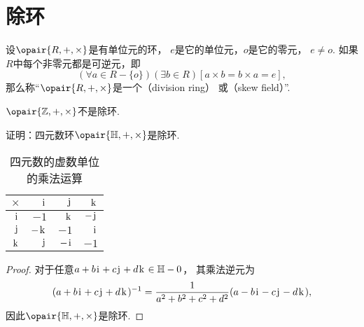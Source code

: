 \section{除环}
\begin{definition}
设\(\opair{R,+,\times}\)是有单位元的环，
\(e\)是它的单位元，\(o\)是它的零元，
\(e \neq o\).
如果\(R\)中每个非零元都是可逆元，即\begin{equation*}
	(\forall a \in R-\{o\})(\exists b \in R)[a \times b = b \times a = e],
\end{equation*}
那么称“\(\opair{R,+,\times}\)是一个（division ring）
或（skew field）”.
\end{definition}

\(\opair{\mathbb{Z},+,\times}\)不是除环.

\begin{example}
证明：四元数环\(\opair{\mathbb{H},+,\times}\)是除环.
\begin{table}[hbt]
	\centering
	\begin{tabular}{r|*3r}
		\(\times\) & \(\iu\) & \(\ju\) & \(\ku\) \\ \hline
		\(\iu\) & \(-1\) & \(\ku\) & \(-\ju\) \\
		\(\ju\) & \(-\ku\) & \(-1\) & \(\iu\) \\
		\(\ku\) & \(\ju\) & \(-\iu\) & \(-1\) \\
	\end{tabular}
	\caption{四元数的虚数单位的乘法运算}
\end{table}
\begin{proof}
对于任意\(a+b\iu+c\ju+d\ku\in\mathbb{H}-0\)，
其乘法逆元为\begin{equation*}
	(a+b\iu+c\ju+d\ku)^{-1}
	= \frac1{a^2+b^2+c^2+d^2} (a-b\iu-c\ju-d\ku),
\end{equation*}
因此\(\opair{\mathbb{H},+,\times}\)是除环.
\end{proof}
\end{example}

